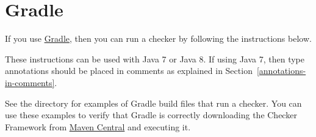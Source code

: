 \section{Gradle\label{gradle}}

If you use \href{https://gradle.org/}{Gradle},
then you can run a checker by following the instructions below.

These instructions can be used with Java 7 or Java 8.  If using Java 7, then
type annotations should be placed in comments as explained in
Section~\ref{annotations-in-comments}.

See the directory  for examples of Gradle
build files that run a checker.  You can use these examples to verify that
Gradle is correctly downloading the Checker Framework from
\href{http://search.maven.org/#search\%7Cga\%7C1\%7Corg.checkerframework}{Maven
  Central} and executing it.

